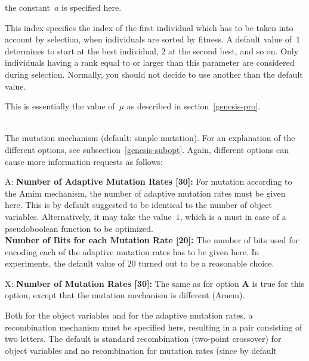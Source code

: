 \begin{description}
\begin{Itemize}
		the constant~$a$ is specified here.
	\end{Itemize}
%
\item[	Lower Selection Index {[1]}:]
	This index specifies the index of the first individual which 
	has to be taken into account by selection, when individuals are sorted
	by fitness.
	A default value of~$1$ determines to start at the best individual,
	$2$ at the second best, and so on.
	Only individuals having a rank equal to or larger than this parameter
	are considered during selection.
	Normally, you should not decide to use another than the default value.
%
\item[	Upper Selection Index {[50]}:]
	This is essentially the value of~$\mu$ as described in 
	section~\ref{genesis-pro}.
%
\item[	Mutation Mechanism {[S]}:]
	\ifUS
	\mbox{}\\
	\fi
	The mutation mechanism (default: simple mutation).
	For an explanation of the different options, see 
	subsection~\ref{genesis-subopt}.
	Again, different options can cause more information requests as
	follows:
	\begin{Itemize}
	\item[A:] {\bf Number of Adaptive Mutation Rates {[30]}:}
		For mutation according to the {\sc Amim} mechanism, the
		number of adaptive mutation rates must be given here.
		This is by default suggested to be identical to the number of
		object variables.
		Alternatively, it may take the value~$1$, which is a must
		in case of a pseudoboolean function to be optimized.	\\
		{\bf Number of Bits for each Mutation Rate {[20]}:}
		The number of bits used for encoding each of the adaptive
		mutation rates has to be given here.
		In experiments, the default value of $20$ turned out to be
		a reasonable choice.
	\item[X:] {\bf Number of Mutation Rates {[30]}:}
		The same as for option {\bf A} is true for this option, except
		that the mutation mechanism is different ({\sc Amem}).
	\end{Itemize}
%
\item[	Mutation Probability {[0.001]}]{}
%
\item[	Recombination Mechanism {[S\_]}:]
	Both for the object variables and for the adaptive mutation rates,
	a recombination mechanism must be specified here, resulting in a
	pair consisting of two letters.
	The default is standard recombination (two-point crossover) for object
	variables and no recombination for mutation rates (since by default

\end{description}
